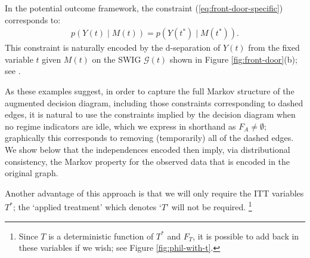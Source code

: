 \documentclass[11pt]{article}
\newcommand{\G}{{\mathscr G}}
\begin{document}
{In the potential outcome framework, the constraint (\ref{eq:front-door-specific}) corresponds to:
\begin{align}\label{eq:swig-indep-front-door}
p(Y(t) \mid M(t)) = p(Y(t^*) \mid M(t^*)).
\end{align}
This constraint is naturally encoded by the d-separation of $Y(t)$ from the  fixed variable $t$ given $M(t)$ on the SWIG $\G(t)$ shown in Figure \ref{fig:front-door}(b); see \cite{shpitser2021multivariate, malinsky19po,robins2018dseparation}. 



As these examples suggest, in order to capture the full Markov structure of the augmented decision diagram, including those constraints corresponding to dashed edges, 
it is natural to use the constraints implied by the decision diagram when no regime indicators are idle, which we express in shorthand as $F_A\neq \emptyset$; graphically this corresponds to removing (temporarily) all of the dashed edges. We show below that the independences encoded then imply,  via distributional consistency, the Markov property for the observed data that is encoded in the original graph.

Another advantage of this approach is that we will only require the ITT variables $T^*$; the `applied treatment' which \citet{dawid:2021} denotes `$T$' will not be required.%
\footnote{Since $T$ is a deterministic function of $T^*$ and $F_T$, it is possible to add back in these variables if we wish; see Figure \ref{fig:phil-with-t}.}



}
\end{document}
